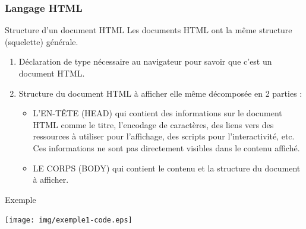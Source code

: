 \documentclass[8pt]{beamer}
\newcounter{num}
\begin{document}
\begin{frame}
\frametitle{Langage HTML}

\begin{block}{Structure d'un document HTML}
Les documents HTML ont la même structure (squelette) générale.
\begin{enumerate}
\item Déclaration de type nécessaire au navigateur pour savoir que c'est un document HTML.
\item Structure du document HTML à afficher elle même décomposée en 2 parties :
\begin{itemize}
\item L'EN-TÊTE (HEAD) qui contient des informations sur le document HTML comme le titre, l'encodage de caractères, des liens vers des ressources à utiliser pour l'affichage, des scripts pour l'interactivité, etc. Ces informations ne sont pas directement visibles dans le contenu affiché.
\item LE CORPS (BODY) qui contient le contenu et la structure du document à afficher.
\end{itemize}
\end{enumerate}

\end{block}

\begin{exampleblock}{Exemple}
\begin{center}
\texttt{[image: img/exemple1-code.eps]}
\end{center}
\end{exampleblock}

\end{frame}
\end{document}
